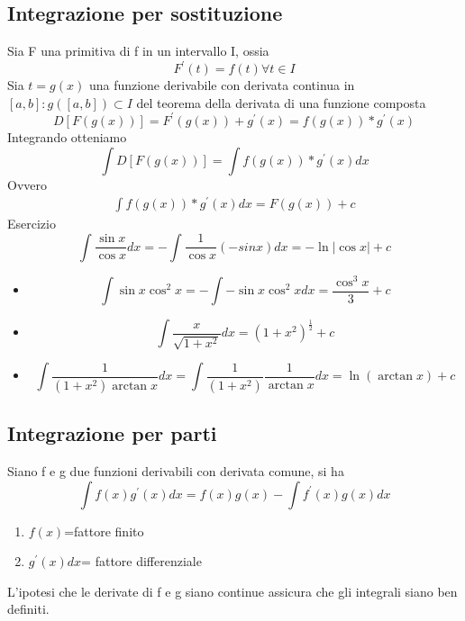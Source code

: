 \subsection{Integrazione per sostituzione}
Sia F una primitiva di f in un intervallo I, ossia 
\begin{equation*}
	F^\prime (t)=f(t) \forall t\in I
\end{equation*}
Sia $t=g(x)$ una funzione derivabile con derivata continua in $[a,b]:g([a,b])\subset I$ del teorema della derivata di una funzione composta
\begin{equation*}
	D[F(g(x))]=F^\prime(g(x))+g^\prime(x)=f(g(x))*g^\prime(x)
\end{equation*}
Integrando otteniamo
\begin{equation*}
	\int D[F(g(x))]=\int f(g(x))*g^\prime(x)dx
\end{equation*}
Ovvero 
\begin{eqnarray*}
	\int f(g(x))*g^\prime(x)dx=F(g(x))+c
\end{eqnarray*}
Esercizio
\begin{equation*}
	\int \frac{\sin x}{\cos x}dx=-\int \frac{1}{\cos x}(-sin x)dx=-\ln |\cos x| +c 
\end{equation*}
\begin{itemize}
	\item \begin{equation*}
			\int \sin x \cos^2 x=-\int-\sin x \cos^2xdx=\frac{\cos^3 x}{3}+c
		\end{equation*}
	\item \begin{equation*}
			\int \frac{x}{\sqrt{1+x^2}}dx=(1+x^2)^\frac{1}{2}+c
		\end{equation*}
	\item \begin{equation*}
		\int \frac{1}{(1+x^2)\arctan x}dx=\int \frac{1}{(1+x^2)}\frac{1}{\arctan x}dx=\ln(\arctan x)+c
	\end{equation*}
\end{itemize}
\subsection{Integrazione per parti}
Siano f e g due funzioni derivabili con derivata comune, si ha
\begin{equation}
	\int f(x)g^\prime(x)dx=f(x)g(x)-\int f^\prime(x)g(x)dx
\end{equation}
\begin{enumerate}
	\item $f(x)$=fattore finito
	\item $g^\prime (x)dx$= fattore differenziale
\end{enumerate}
L'ipotesi che le derivate di f e g siano continue assicura che gli integrali siano ben definiti.
